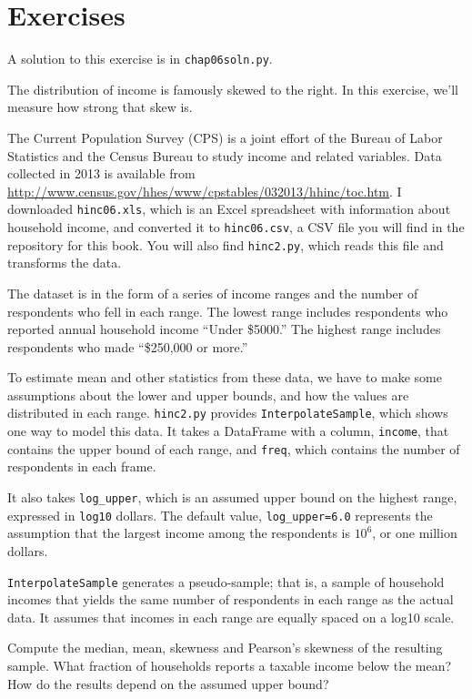 \documentclass[12pt]{book}
\begin{document}
\section{Exercises}

A solution to this exercise is in \verb"chap06soln.py".

\begin{exercise}

The distribution of income is famously skewed to the right.  In this
exercise, we'll measure how strong that skew is.

The Current Population Survey (CPS) is a joint effort of the Bureau
of Labor Statistics and the Census Bureau to study income and related
variables.  Data collected in 2013 is available from
\url{http://www.census.gov/hhes/www/cpstables/032013/hhinc/toc.htm}.
I downloaded \verb"hinc06.xls", which is an Excel spreadsheet with
information about household income, and converted it to \verb"hinc06.csv",
a CSV file you will find in the repository for this book.  You
will also find \verb"hinc2.py", which reads this file and transforms
the data.

The dataset is in the form of a series of income ranges and the number
of respondents who fell in each range.  The lowest range includes
respondents who reported annual household income ``Under \$5000.''
The highest range includes respondents who made ``\$250,000 or
more.''

To estimate mean and other statistics from these data, we have to
make some assumptions about the lower and upper bounds, and how
the values are distributed in each range.  \verb"hinc2.py" provides
\verb"InterpolateSample", which shows one way to model
this data.  It takes a DataFrame with a column, \verb"income", that
contains the upper bound of each range, and \verb"freq", which contains
the number of respondents in each frame.

It also takes \verb"log_upper", which is an assumed upper bound
on the highest range, expressed in \verb"log10" dollars.  
The default value, \verb"log_upper=6.0" represents the assumption
that the largest income among the respondents is
$10^6$, or one million dollars.

\verb"InterpolateSample" generates a pseudo-sample; that is, a sample
of household incomes that yields the same number of respondents
in each range as the actual data.  It assumes that incomes in
each range are equally spaced on a log10 scale.

Compute the median, mean, skewness and Pearson's skewness of the
resulting sample.  What fraction of households reports a taxable
income below the mean?  How do the results depend on the assumed
upper bound?
\end{exercise}
\end{document}

